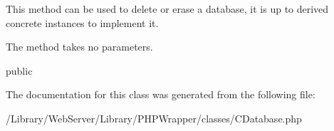 This method can be used to delete or erase a database, it is up to derived concrete instances to implement it.

The method takes no parameters.

public 

The documentation for this class was generated from the following file\-:\begin{DoxyCompactItemize}
\item 
/\-Library/\-Web\-Server/\-Library/\-P\-H\-P\-Wrapper/classes/C\-Database.\-php\end{DoxyCompactItemize}
